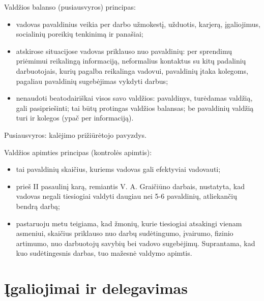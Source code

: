 Valdžios balanso (pusiausvyros) principas:
\begin{itemize}
  \item vadovas pavaldinius veikia per darbo užmokestį, užduotis, karjerą,
    įgaliojimus, socialinių poreikių tenkinimą ir panašiai;
  \item atskirose situacijose vadovas priklauso nuo pavaldinių: per
    sprendimų priėmimui reikalingą informaciją, neformalius kontaktus
    su kitų padalinių darbuotojais, kurių pagalba reikalinga vadovui,
    pavaldinių įtaka kolegoms, pagaliau pavaldinių sugebėjimas vykdyti
    darbus;
  \item nenaudoti beatodairiškai visos savo valdžios: pavaldinys,
    turėdamas valdžią, gali pasipriešinti; tai būtų protingas valdžios
    balansas; be pavaldinių valdžią turi ir kolegos (ypač per informaciją).
\end{itemize}

Pusiausvyros: kalėjimo prižiūrėtojo pavyzdys.

Valdžios apimties principas (kontrolės apimtis):
\begin{itemize}
  \item tai pavaldinių skaičius, kuriems vadovas gali efektyviai vadovauti;
  \item prieš II pasaulinį karą, remiantis V. A. Graičiūno darbais,
    nustatyta, kad vadovas negali tiesiogiai valdyti daugiau nei
    5-6 pavaldinių, atliekančių bendrą darbą;
  \item pastaruoju metu teigiama, kad žmonių, kurie tiesiogiai atsakingi
    vienam asmeniui, skaičius priklauso nuo darbų sudėtingumo, įvairumo,
    fizinio artimumo, nuo darbuotojų savybių bei vadovo sugebėjimų.
    Suprantama, kad kuo sudėtingesnis darbas, tuo mažesnė valdymo
    apimtis.
\end{itemize}

\section{Įgaliojimai ir delegavimas}

